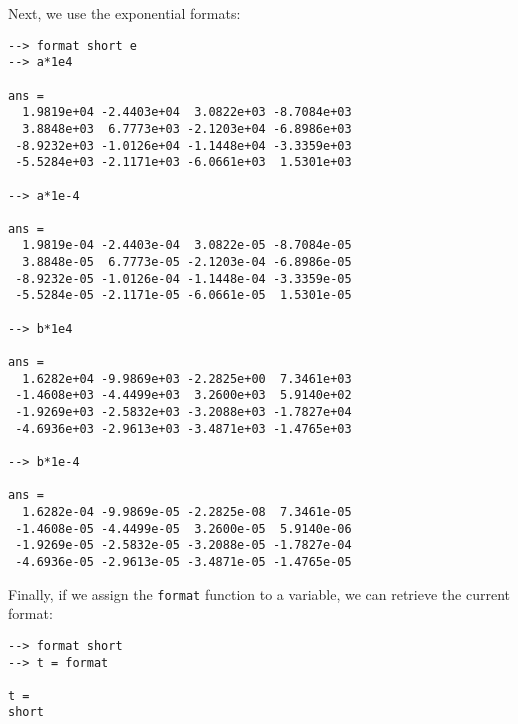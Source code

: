 Next, we use the exponential formats:
\begin{verbatim}
--> format short e
--> a*1e4

ans = 
  1.9819e+04 -2.4403e+04  3.0822e+03 -8.7084e+03 
  3.8848e+03  6.7773e+03 -2.1203e+04 -6.8986e+03 
 -8.9232e+03 -1.0126e+04 -1.1448e+04 -3.3359e+03 
 -5.5284e+03 -2.1171e+03 -6.0661e+03  1.5301e+03 

--> a*1e-4

ans = 
  1.9819e-04 -2.4403e-04  3.0822e-05 -8.7084e-05 
  3.8848e-05  6.7773e-05 -2.1203e-04 -6.8986e-05 
 -8.9232e-05 -1.0126e-04 -1.1448e-04 -3.3359e-05 
 -5.5284e-05 -2.1171e-05 -6.0661e-05  1.5301e-05 

--> b*1e4

ans = 
  1.6282e+04 -9.9869e+03 -2.2825e+00  7.3461e+03 
 -1.4608e+03 -4.4499e+03  3.2600e+03  5.9140e+02 
 -1.9269e+03 -2.5832e+03 -3.2088e+03 -1.7827e+04 
 -4.6936e+03 -2.9613e+03 -3.4871e+03 -1.4765e+03 

--> b*1e-4

ans = 
  1.6282e-04 -9.9869e-05 -2.2825e-08  7.3461e-05 
 -1.4608e-05 -4.4499e-05  3.2600e-05  5.9140e-06 
 -1.9269e-05 -2.5832e-05 -3.2088e-05 -1.7827e-04 
 -4.6936e-05 -2.9613e-05 -3.4871e-05 -1.4765e-05 
\end{verbatim}
Finally, if we assign the \verb|format| function to a variable, we can retrieve the 
current format:
\begin{verbatim}
--> format short
--> t = format

t = 
short
\end{verbatim}
